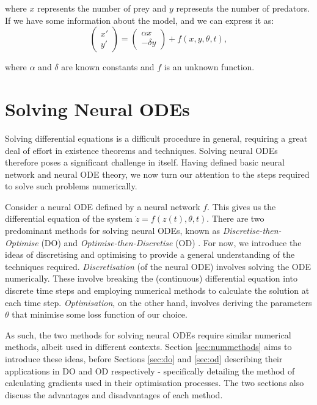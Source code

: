 \documentclass[a4paper,11pt,titlepage]{article}
\theoremstyle{definition}
\theoremstyle{plain}
\theoremstyle{remark}
\begin{document}
where $x$ represents the number of prey and $y$ represents the number of predators. If we have some information about the model, and we can express it as:
$$
\begin{pmatrix}x'\\ y'
\end{pmatrix}=\begin{pmatrix}\alpha x\\-\delta y\end{pmatrix}+f(x,y,\theta,t),
$$

where $\alpha$ and $\delta$ are known constants and $f$ is an unknown function.

\pagebreak
\section{Solving Neural ODEs}
\label{sec:solvingNODEs}

Solving differential equations is a difficult procedure in general, requiring a great deal of effort in existence theorems and techniques. Solving neural ODEs therefore poses a significant challenge in itself. Having defined basic neural network and neural ODE theory, we now turn our attention to the steps required to solve such problems numerically.

Consider a neural ODE defined by a neural network $f$. This gives us the differential equation of the system $\dot{z}=f(z(t),\theta,t)$. There are two predominant methods for solving neural ODEs, known as \textit{Discretise-then-Optimise} (DO) and \textit{Optimise-then-Discretise} (OD) \cite{kidger2022neural}. For now, we introduce the ideas of discretising and optimising to provide a general understanding of the techniques required. \textit{Discretisation} (of the neural ODE) involves solving the ODE numerically. These involve breaking the (continuous) differential equation into discrete time steps and employing numerical methods to calculate the solution at each time step. \textit{Optimisation}, on the other hand, involves deriving the parameters $\theta$ that minimise some loss function of our choice. 

As such, the two methods for solving neural ODEs require similar numerical methods, albeit used in different contexts. Section \ref{sec:nummethods} aims to introduce these ideas, before Sections \ref{sec:do} and \ref{sec:od} describing their applications in DO and OD respectively - specifically detailing the method of calculating gradients used in their optimisation processes. The two sections also discuss the advantages and disadvantages of each method.
\end{document}
